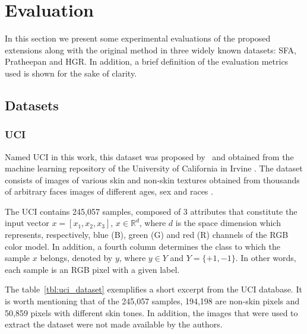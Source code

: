 \chapter{Evaluation}
\label{cap:experimentos}

In this section we present some experimental evaluations of the proposed extensions along with the original method in three widely known datasets: SFA, Pratheepan and HGR. In addition, a brief definition of the evaluation metrics used is shown for the sake of clarity.


\section{Datasets}
\label{sec:datasets}

\subsection{UCI}
\label{sec:datasets_uci}
Named UCI in this work, this dataset was proposed by~\citet{uci-skin-dataset:12} and obtained from the machine learning repository of the University of California in Irvine \citep{lichman:13}. The dataset consists of images of various skin and non-skin textures obtained from thousands of arbitrary faces images of different ages, sex and races \citep{pal-texas:04, feret:96}.

The UCI contains 245,057 samples, composed of 3 attributes that constitute the input vector $x = [x_1, x_2, x_3]$, $x \in \mathbb{R}^{d}$, where $d$ is the space dimension which represents, respectively, blue (B), green (G) and red (R) channels of the RGB color model. In addition, a fourth column determines the class to which the sample $x$ belongs, denoted by $y$, where $y \in Y$ and $Y = \{+1, -1\}$. In other words, each sample is an RGB pixel with a given label.

The table~\ref{tbl:uci_dataset} exemplifies a short excerpt from the UCI database. It is worth mentioning that of the 245,057 samples, 194,198 are non-skin pixels and 50,859 pixels with different skin tones. In addition, the images that were used to extract the dataset were not made available by the authors.


